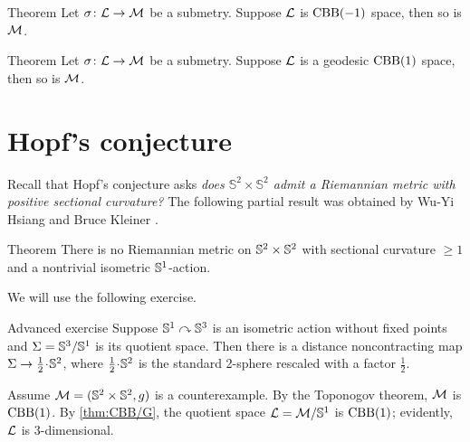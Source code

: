 \begin{thm}{Theorem}\label{thm:submetry-CBB-1}
Let $\sigma\colon\mathcal{L}\to\mathcal{M}$ be a submetry.
Suppose $\mathcal{L}$ is $\mathrm{CBB}(-1)$ space, then so is $\mathcal{M}$.
\end{thm}

\begin{thm}{Theorem}\label{thm:submetry-CBB1}
Let $\sigma\colon\mathcal{L}\to\mathcal{M}$ be a submetry.
Suppose $\mathcal{L}$ is a geodesic $\mathrm{CBB}(1)$ space, then so is $\mathcal{M}$.
\end{thm}

\section{Hopf's conjecture}

Recall that Hopf's conjecture asks \textit{does $\mathbb{S}^2\times\mathbb{S}^2$ admit a Riemannian metric with positive sectional curvature?}
The following partial result was obtained by Wu-Yi Hsiang and Bruce Kleiner \cite{hsiang-kleiner}.

\begin{thm}{Theorem}\label{thm:hsiang-kleiner}
There is no Riemannian metric on $\mathbb{S}^2\times\mathbb{S}^2$ with sectional curvature $\ge 1$ and a nontrivial isometric $\mathbb{S}^1$-action.
\end{thm}

We will use the following exercise.

\begin{thm}{Advanced exercise}\label{ex:S^3/S^1}
Suppose $\mathbb{S}^1\curvearrowright\mathbb{S}^3$ is an isometric action without fixed points 
and $\Sigma=\mathbb{S}^3/\mathbb{S}^1$ is its quotient space.
Then there is a distance noncontracting map $\Sigma\to \tfrac12\cdot \SSS^2$, where $\tfrac12\cdot \SSS^2$ is the standard 2-sphere rescaled with a factor $\tfrac12$.
\end{thm}


Assume $\mathcal{M}=(\mathbb{S}^2\times\mathbb{S}^2,g)$ is a counterexample.
By the Toponogov theorem, $\mathcal{M}$ is $\mathrm{CBB}(1)$.
By \ref{thm:CBB/G}, the quotient space $\spc{L}\z=\spc{M}/\SSS^1$ is $\mathrm{CBB}(1)$;
evidently, $\mathcal{L}$ is 3-dimensional.

